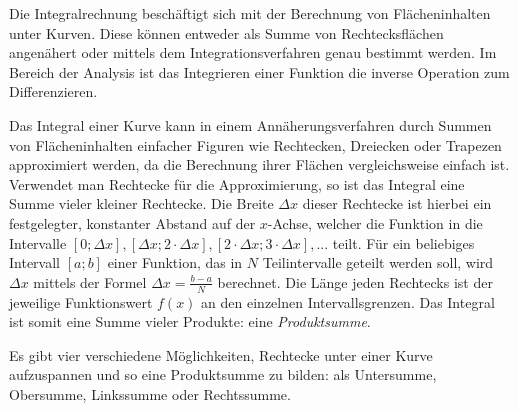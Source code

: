 



\thispagestyle{plain}


Die Integralrechnung besch\"{a}ftigt sich mit der Berechnung von Fl\"{a}cheninhalten unter Kurven. Diese k\"{o}nnen entweder als Summe von Rechtecksfl\"{a}chen angen\"{a}hert oder mittels dem Integrationsverfahren genau bestimmt werden. Im Bereich der Analysis ist das Integrieren einer Funktion die inverse Operation zum Differenzieren.


Das Integral einer Kurve kann in einem Ann\"{a}herungsverfahren durch Summen von Fl\"{a}cheninhalten einfacher Figuren wie Rechtecken, Dreiecken oder Trapezen approximiert werden, da die Berechnung ihrer Fl\"{a}chen vergleichsweise einfach ist. Verwendet man Rechtecke f\"{u}r die Approximierung, so ist das Integral eine Summe vieler kleiner Rechtecke. Die Breite $\Delta x$ dieser Rechtecke ist hierbei ein festgelegter, konstanter Abstand auf der $x$-Achse, welcher die Funktion in die Intervalle $[0; \Delta x], [\Delta x; 2 \cdot \Delta x], [2 \cdot \Delta x; 3 \cdot \Delta x], ...$ teilt. F\"{u}r ein beliebiges Intervall $[a; b]$ einer Funktion, das in $N$ Teilintervalle geteilt werden soll, wird $\Delta x$ mittels der Formel $\Delta x = \frac{b - a}{N}$ berechnet. Die L\"{a}nge jeden Rechtecks ist der jeweilige Funktionswert $f(x)$ an den einzelnen Intervallsgrenzen. Das Integral ist somit eine Summe vieler Produkte: eine \emph{Produktsumme}. 

Es gibt vier verschiedene M\"{o}glichkeiten, Rechtecke unter einer Kurve aufzuspannen und so eine Produktsumme zu bilden: als Untersumme, Obersumme, Linkssumme oder Rechtssumme.


